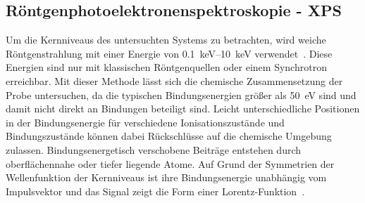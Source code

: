         \subsection{Röntgenphotoelektronenspektroskopie - XPS} \label{sec:XPS}
            Um die Kernniveaus des untersuchten Systems zu betrachten, wird weiche Röntgenstrahlung mit einer Energie von \SIrange{0.1}{10}{\kilo\electronvolt} verwendet~\cite{Fauster}.
            Diese Energien sind nur mit klassischen Röntgenquellen oder einem Synchrotron erreichbar.
            Mit dieser Methode lässt sich die chemische Zusammensetzung der Probe untersuchen, da die typischen Bindungsenergien größer als \SI{50}{\electronvolt} sind und damit nicht direkt an Bindungen beteiligt sind.
            Leicht unterschiedliche Positionen in der Bindungsenergie für verschiedene Ionisationszustände und Bindungszustände können dabei Rückschlüsse auf die chemische Umgebung zulassen.
            Bindungsenergetisch verschobene Beiträge entstehen durch oberflächennahe oder tiefer liegende Atome.
            Auf Grund der Symmetrien der Wellenfunktion der Kernniveaus ist ihre Bindungsenergie unabhängig vom Impulsvektor und das Signal zeigt die Form einer Lorentz-Funktion~\cite{Hüfner}.

